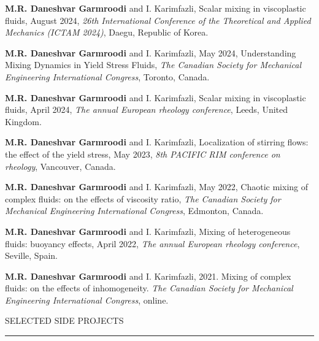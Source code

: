 \documentclass[11pt]{article}
\begin{document}
		
		
		
		 \textbf{M.R. Daneshvar Garmroodi} and I. Karimfazli, Scalar mixing in viscoplastic fluids, August 2024, \textit{26th International Conference of the Theoretical and Applied Mechanics (ICTAM 2024)}, Daegu, Republic of Korea.
		
		 \textbf{M.R. Daneshvar Garmroodi} and I. Karimfazli, May 2024, Understanding Mixing Dynamics in Yield Stress
		Fluids, \textit{The Canadian Society for Mechanical Engineering International Congress}, Toronto, Canada.
		
		 \textbf{M.R. Daneshvar Garmroodi} and I. Karimfazli, Scalar mixing in viscoplastic fluids, April 2024, \textit{The annual European rheology conference}, Leeds, United Kingdom.
		
		 \textbf{M.R. Daneshvar Garmroodi} and I. Karimfazli, Localization of stirring flows: the effect of the yield stress, May 2023, \textit{8th PACIFIC RIM conference on rheology}, Vancouver, Canada.
		
		 \textbf{M.R. Daneshvar Garmroodi} and I. Karimfazli, May 2022, Chaotic mixing of complex fluids: on the effects of viscosity ratio, \textit{The Canadian Society for Mechanical Engineering International Congress}, Edmonton, Canada.
		
		 \textbf{M.R. Daneshvar Garmroodi} and I. Karimfazli, Mixing of heterogeneous fluids: buoyancy effects, April 2022, \textit{The annual European rheology conference}, Seville, Spain.
		
		 \textbf{M.R. Daneshvar Garmroodi} and I. Karimfazli, 2021. Mixing of complex fluids: on the effects of inhomogeneity. \textit{The Canadian Society for Mechanical Engineering International Congress}, online.
		
		\vspace{4mm}
		
		\noindent SELECTED SIDE PROJECTS
		
		\vspace{-2mm}
		
		\noindent\rule[0.5ex]{\linewidth}{1pt}
		
\end{document}
